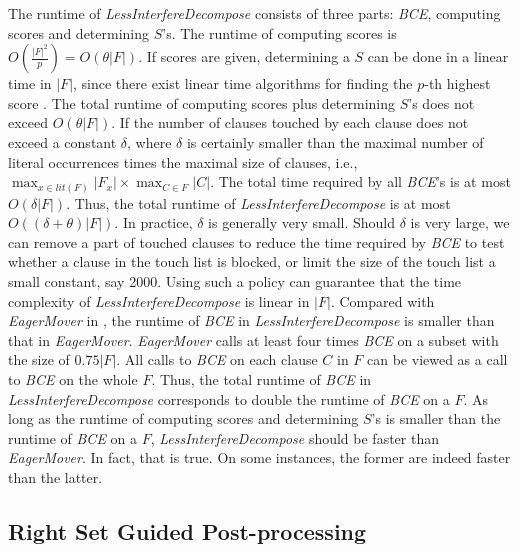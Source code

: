 \documentclass{llncs}
\begin{document}
\nopagebreak[3]

   The runtime of \emph{LessInterfereDecompose} consists of three
   parts: \emph{BCE}, computing scores and determining $S$'s. The runtime of
computing scores is $O(\frac{|F|^2}{p})=O(\theta|F|)$. If scores are
given, determining a $S$ can be done in a linear time in $|F|$,
since there exist linear time algorithms for finding the $p$-th
highest score \cite{find:97,find:00}. The total runtime of computing
scores plus determining $S$'s does not exceed $O(\theta|F|)$. If the
number of clauses touched by each clause does not exceed a constant
$\delta$, where $\delta$  is certainly smaller than the maximal
number of literal occurrences times the maximal size of clauses,
i.e., $\max_{x \in lit(F)} |F_x| \times \max_{C \in
 F}|C|$. The total time required by all \emph{BCE}'s is at most $O(\delta
|F|)$. Thus, the total runtime of \emph{LessInterfereDecompose} is
at most $O((\delta+\theta)|F|)$. In practice, $\delta$ is generally
very small. Should $\delta$ is very large, we can remove a part of
touched clauses to reduce the time required by \emph{BCE} to test
whether a clause in the touch list is blocked, or limit the size of
the touch list a small constant, say 2000. Using such a policy can
guarantee that the time complexity of \emph{LessInterfereDecompose}
is linear in $|F|$. Compared with \emph{EagerMover} in
\cite{EagerMover:14}, the runtime of \emph{BCE} in
\emph{LessInterfereDecompose} is smaller than that in
\emph{EagerMover}.  \emph{EagerMover} calls at least four times
\emph{BCE} on a subset with the size of $0.75|F|$. All calls to
\emph{BCE} on each clause $C$ in $F$ can be viewed as a call to
\emph{BCE} on the whole $F$. Thus, the total runtime of \emph{BCE}
in \emph{LessInterfereDecompose} corresponds to double the runtime
of \emph{BCE} on a $F$. As long as the runtime of computing scores
and determining $S$'s is smaller than the runtime of \emph{BCE} on a
$F$, \emph{LessInterfereDecompose} should be faster than
\emph{EagerMover}. In fact, that is true. On some instances, the
former are indeed faster than the latter.


\subsection{Right Set Guided Post-processing}
\end{document}
